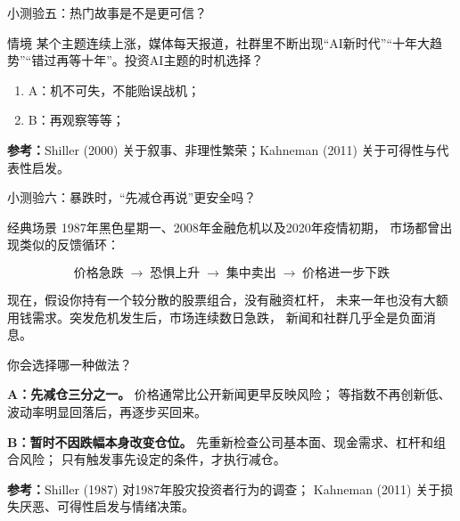 \documentclass[UTF8,aspectratio=169,11pt]{ctexbeamer}
\newcommand{\source}[1]{\vfill{\scriptsize\color{aqgray}\textbf{参考：}#1}}
\begin{document}
\begin{frame}{小测验五：热门故事是不是更可信？}
\begin{casebox}{情境}
\small
某个主题连续上涨，媒体每天报道，社群里不断出现“AI新时代”“十年大趋势”“错过再等十年”。投资AI主题的时机选择？
\end{casebox}
\begin{enumerate}
\item A：机不可失，不能贻误战机；
\item B：再观察等等；
\end{enumerate}
\source{Shiller (2000) 关于叙事、非理性繁荣；Kahneman (2011) 关于可得性与代表性启发。}
\end{frame}


\begin{frame}{小测验六：暴跌时，“先减仓再说”更安全吗？}

\begin{casebox}{经典场景}
\small
1987年黑色星期一、2008年金融危机以及2020年疫情初期，
市场都曾出现类似的反馈循环：

\[
\text{价格急跌}
\;\rightarrow\;
\text{恐惧上升}
\;\rightarrow\;
\text{集中卖出}
\;\rightarrow\;
\text{价格进一步下跌}
\]

现在，假设你持有一个较分散的股票组合，没有融资杠杆，
未来一年也没有大额用钱需求。突发危机发生后，市场连续数日急跌，
新闻和社群几乎全是负面消息。
\end{casebox}

\vspace{0.15cm}

\begin{keybox}{你会选择哪一种做法？}
\small

\textbf{A：先减仓三分之一。}\;
价格通常比公开新闻更早反映风险；
等指数不再创新低、波动率明显回落后，再逐步买回来。

\vspace{0.12cm}

\textbf{B：暂时不因跌幅本身改变仓位。}\;
先重新检查公司基本面、现金需求、杠杆和组合风险；
只有触发事先设定的条件，才执行减仓。
\end{keybox}


\source{Shiller (1987) 对1987年股灾投资者行为的调查；
Kahneman (2011) 关于损失厌恶、可得性启发与情绪决策。}
\end{frame}
\end{document}
